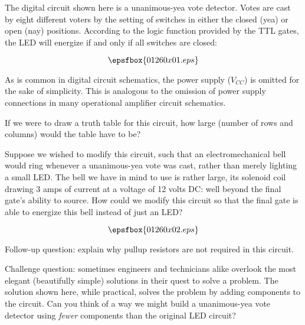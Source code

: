

The digital circuit shown here is a unanimous-yea vote detector.  Votes are cast by eight different voters by the setting of switches in either the closed (yea) or open (nay) positions.  According to the logic function provided by the TTL gates, the LED will energize if and only if all switches are closed:

$$\epsfbox{01260x01.eps}$$

As is common in digital circuit schematics, the power supply ($V_{CC}$) is omitted for the sake of simplicity.  This is analogous to the omission of power supply connections in many operational amplifier circuit schematics.

If we were to draw a truth table for this circuit, how large (number of rows and columns) would the table have to be?

Suppose we wished to modify this circuit, such that an electromechanical bell would ring whenever a unanimous-yea vote was cast, rather than merely lighting a small LED.  The bell we have in mind to use is rather large, its solenoid coil drawing 3 amps of current at a voltage of 12 volts DC: well beyond the final gate's ability to source.  How could we modify this circuit so that the final gate is able to energize this bell instead of just an LED?







$$\epsfbox{01260x02.eps}$$

\vskip 10pt

Follow-up question: explain why pullup resistors are not required in this circuit.

\vskip 10pt

Challenge question: sometimes engineers and technicians alike overlook the most elegant (beautifully simple) solutions in their quest to solve a problem.  The solution shown here, while practical, solves the problem by adding components to the circuit.  Can you think of a way we might build a unanimous-yea vote detector using {\it fewer} components than the original LED circuit?






